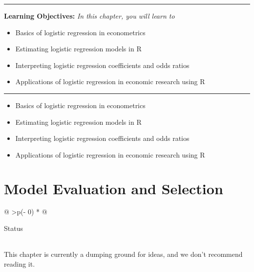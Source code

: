 \documentclass[
  letterpaper,
  paper =a4,
  twoside,
  openright,
  headsepline,
  footsepline,
  listof = totocnumbered,
  chapterprefix = true,
  firstiscover]{scrbook}
\providecommand{\abstractname}{Learning Objectives} %
\newenvironment{objectives}[1]{%
	\hrule
	\vspace{5pt}
	\small\textbf{\abstractname: } 
	\newline
	\vspace{0.1cm}
	\small\emph{#1} %
	\itshape %
}{%
	\vspace{5pt}
	\hrule
	\vspace{0.6cm}
}
\begin{document}
\begin{objectives}{In this chapter, you will learn to}
\begin{itemize}

\item{Basics of logistic regression in econometrics}

\item{Estimating logistic regression models in R}

\item{Interpreting logistic regression coefficients and odds ratios}

\item{Applications of logistic regression in economic research using R}

\end{itemize}

\end{objectives}

\begin{itemize}
\item
  Basics of logistic regression in econometrics
\item
  Estimating logistic regression models in R
\item
  Interpreting logistic regression coefficients and odds ratios
\item
  Applications of logistic regression in economic research using R
\end{itemize}


\hypertarget{model-evaluation-and-selection}{%
\chapter{Model Evaluation and
Selection}\label{model-evaluation-and-selection}}

\begin{longtable}[]{@{}
  >{\centering\arraybackslash}p{(\columnwidth - 0\tabcolsep) * }@{}}
\toprule\noalign{}
\begin{minipage}[b]{\linewidth}\centering
Status
\end{minipage} \\
\midrule\noalign{}
\endhead
\bottomrule\noalign{}
\endlastfoot
This chapter is currently a dumping ground for ideas, and we don't
recommend reading it. \\
\end{longtable}
\end{document}
